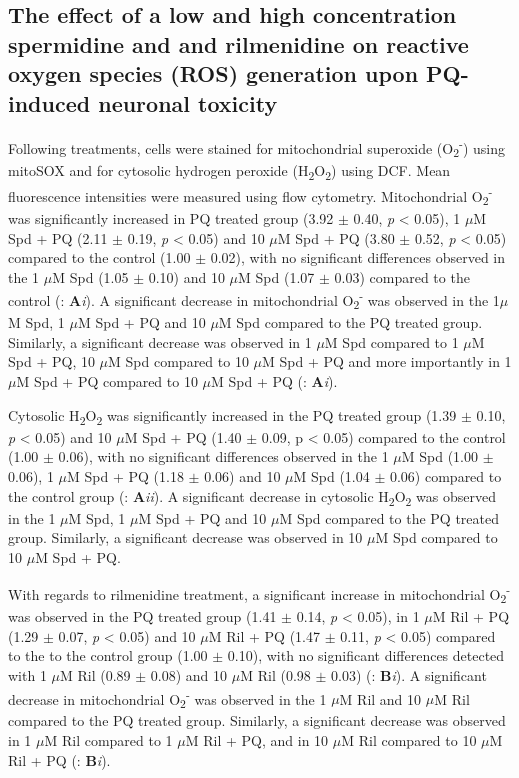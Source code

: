 \subsection{The effect of a low and high concentration spermidine and and rilmenidine on reactive oxygen species (ROS) generation upon PQ-induced neuronal toxicity}
Following treatments, cells were stained for mitochondrial superoxide (O\textsubscript{2}\textsuperscript{-}) using mitoSOX and for cytosolic hydrogen peroxide (H\textsubscript{2}O\textsubscript{2}) using DCF. Mean fluorescence intensities were measured using flow cytometry. Mitochondrial O\textsubscript{2}\textsuperscript{-} was significantly increased in PQ treated group (3.92 $\pm$ 0.40, \textit{p} < 0.05), 1 $\mu$M Spd + PQ (2.11 $\pm$ 0.19, \textit{p} < 0.05) and 10 $\mu$M Spd + PQ (3.80 $\pm$ 0.52, \textit{p} < 0.05) compared to the control (1.00 $\pm$ 0.02), with no significant differences observed in the 1 $\mu$M Spd (1.05 $\pm$ 0.10) and 10 $\mu$M Spd (1.07 $\pm$ 0.03) compared to the control (: \textbf{A}\textit{i}). A significant decrease in mitochondrial O\textsubscript{2}\textsuperscript{-} was observed in the 1$\mu$M Spd, 1 $\mu$M Spd + PQ and 10 $\mu$M Spd compared to the PQ treated group. Similarly, a significant decrease was observed in 1 $\mu$M Spd compared to 1 $\mu$M Spd + PQ, 10 $\mu$M Spd compared to 10 $\mu$M Spd + PQ and more importantly in 1 $\mu$M Spd + PQ compared to 10 $\mu$M Spd + PQ (: \textbf{A}\textit{i}). 

Cytosolic H\textsubscript{2}O\textsubscript{2} was significantly increased in the PQ treated group (1.39 $\pm$ 0.10, \textit{p} < 0.05) and 10 $\mu$M Spd + PQ (1.40 $\pm$ 0.09, p < 0.05) compared to the control (1.00 $\pm$ 0.06), with no significant differences observed in the 1 $\mu$M Spd (1.00 $\pm$ 0.06), 1 $\mu$M Spd + PQ (1.18 $\pm$ 0.06) and 10 $\mu$M Spd (1.04 $\pm$ 0.06) compared to the control group (: \textbf{A}\textit{ii}). A significant decrease in cytosolic H\textsubscript{2}O\textsubscript{2} was observed in the 1 $\mu$M Spd, 1 $\mu$M Spd + PQ and 10 $\mu$M Spd compared to the PQ treated group. Similarly, a significant decrease was observed in 10 $\mu$M Spd compared to 10 $\mu$M Spd + PQ.

With regards to rilmenidine treatment, a significant increase in mitochondrial O\textsubscript{2}\textsuperscript{-} was observed in the PQ treated group (1.41 $\pm$ 0.14, \textit{p} < 0.05), in 1 $\mu$M Ril + PQ (1.29 $\pm$ 0.07, \textit{p} < 0.05) and 10 $\mu$M Ril + PQ (1.47 $\pm$ 0.11, \textit{p} < 0.05) compared to the to the control group (1.00 $\pm$ 0.10), with no significant differences detected with 1 $\mu$M Ril (0.89 $\pm$ 0.08) and 10 $\mu$M Ril (0.98 $\pm$ 0.03) (: \textbf{B}\textit{i}). A significant decrease in mitochondrial O\textsubscript{2}\textsuperscript{-} was observed in the 1 $\mu$M Ril and 10 $\mu$M Ril compared to the PQ treated group. Similarly, a significant decrease was observed in 1 $\mu$M Ril compared to 1 $\mu$M Ril + PQ, and in 10 $\mu$M Ril compared to 10 $\mu$M Ril + PQ (: \textbf{B}\textit{i}). 

